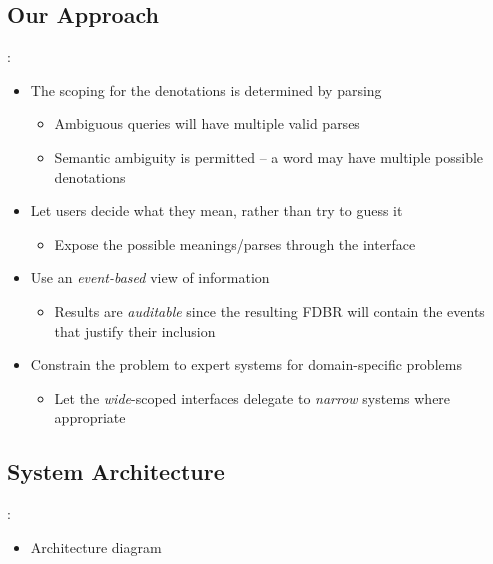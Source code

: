 \documentclass[logoontitle,tabu,supertabular,aspectratio=43]{preney-uwindsor-beamer}
\begin{document}
    \subsection{Our Approach}
    \begin{frame}{\insertsection: \insertsubsection}
        \begin{itemize}
            \item The scoping for the denotations is determined by parsing
            \begin{itemize}
                \item Ambiguous queries will have multiple valid parses
                \item Semantic ambiguity is permitted -- a word may have multiple possible denotations
            \end{itemize}
            \item Let users decide what they mean, rather than try to guess it
            \begin{itemize}
                \item Expose the possible meanings/parses through the interface
            \end{itemize}
            \item Use an {\em event-based} view of information \cite{frost:eswcposter2014}
            \begin{itemize}
                \item Results are {\em auditable} since the resulting FDBR will contain the events that justify their inclusion
            \end{itemize}
            \item Constrain the problem to expert systems for domain-specific problems
            \begin{itemize}
                \item Let the {\em wide}-scoped interfaces delegate to {\em narrow} systems where appropriate
            \end{itemize}
        \end{itemize}
    \end{frame}

    \subsection{System Architecture}
    \begin{frame}{\insertsection: \insertsubsection}
        \begin{itemize}
            \item Architecture diagram
        \end{itemize}
    \end{frame}
\end{document}

